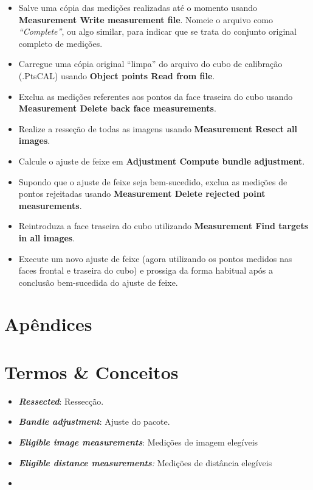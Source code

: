 \documentclass[
  12pt,
  letterpaper,
  DIV=11,
  numbers=noendperiod]{scrreprt}
\begin{document}
\begin{itemize}
\item
  Salve uma cópia das medições realizadas até o momento usando
  \textbf{Measurement \textbar{} Write measurement file}. Nomeie o
  arquivo como \emph{``Complete''}, ou algo similar, para indicar que se
  trata do conjunto original completo de medições.
\item
  Carregue uma cópia original ``limpa'' do arquivo do cubo de calibração
  (.PtsCAL) usando \textbf{Object points \textbar{} Read from file}.
\item
  Exclua as medições referentes aos pontos da face traseira do cubo
  usando \textbf{Measurement \textbar{} Delete back face measurements}.
\item
  Realize a resseção de todas as imagens usando \textbf{Measurement
  \textbar{} Resect all images}.
\item
  Calcule o ajuste de feixe em \textbf{Adjustment \textbar{} Compute
  bundle adjustment}.
\item
  Supondo que o ajuste de feixe seja bem-sucedido, exclua as medições de
  pontos rejeitadas usando \textbf{Measurement \textbar{} Delete
  rejected point measurements}.
\item
  Reintroduza a face traseira do cubo utilizando \textbf{Measurement
  \textbar{} Find targets in all images}.
\item
  Execute um novo ajuste de feixe (agora utilizando os pontos medidos
  nas faces frontal e traseira do cubo) e prossiga da forma habitual
  após a conclusão bem-sucedida do ajuste de feixe.
\end{itemize}

\chapter{Apêndices}\label{apuxeandices}

\chapter{Termos \& Conceitos}\label{termos-conceitos-1}

\begin{itemize}
\item
  \textbf{\emph{Ressected}}: Ressecção.
\item
  \textbf{\emph{Bandle adjustment}}: Ajuste do pacote.
\item
  \textbf{\emph{Eligible image measurements}}: Medições de imagem
  elegíveis
\item
  \emph{\textbf{Eligible distance measurements}:} Medições de distância
  elegíveis
\item
\end{itemize}
\end{document}
